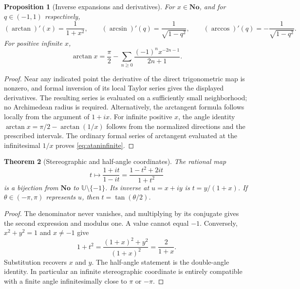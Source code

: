 \documentclass[11pt,letterpaper]{article}
\newtheorem{theorem}{Theorem}[section]
\newtheorem{proposition}[theorem]{Proposition}
\theoremstyle{definition}
\theoremstyle{remark}
\newcommand{\No}{\mathbf{No}}
\newcommand{\UU}{\mathbb U}\newcommand{\HH}{\mathcal H}
\numberwithin{equation}{section}
\begin{document}
\begin{proposition}[Inverse expansions and derivatives]\label{prop:inverses}
For $x\in\No$, and for $q\in(-1,1)$ respectively,
\[
 (\arctan)'(x)=\frac1{1+x^2},\qquad
 (\arcsin)'(q)=\frac1{\sqrt{1-q^2}},\qquad
 (\arccos)'(q)=-\frac1{\sqrt{1-q^2}}.
\]
For positive infinite $x$,
\begin{equation}\label{eq:ataninfinite}
 \arctan x=\frac\pi2-\sum_{n\ge0}\frac{(-1)^n x^{-2n-1}}{2n+1}.
\end{equation}
\end{proposition}
\begin{proof}
Near any indicated point the derivative of the direct trigonometric map is nonzero, and formal inversion of its local Taylor series gives the displayed derivatives. The resulting series is evaluated on a sufficiently small neighborhood; no Archimedean radius is required. Alternatively, the arctangent formula follows locally from the argument of $1+ix$. For infinite positive $x$, the angle identity $\arctan x=\pi/2-\arctan(1/x)$ follows from the normalized directions and the prescribed intervals. The ordinary formal series of arctangent evaluated at the infinitesimal $1/x$ proves \eqref{eq:ataninfinite}.
\end{proof}

\begin{theorem}[Stereographic and half-angle coordinates]\label{thm:stereo}
The rational map
\begin{equation}\label{eq:cayley}
 t\longmapsto \frac{1+it}{1-it}
 =\frac{1-t^2+2it}{1+t^2}
\end{equation}
is a bijection from $\No$ to $\UU\setminus\{-1\}$. Its inverse at $u=x+iy$ is $t=y/(1+x)$. If $\theta\in(-\pi,\pi)$ represents $u$, then $t=\tan(\theta/2)$.
\end{theorem}
\begin{proof}
The denominator never vanishes, and multiplying by its conjugate gives the second expression and modulus one. A value cannot equal $-1$. Conversely, $x^2+y^2=1$ and $x\ne-1$ give
\[
 1+t^2=\frac{(1+x)^2+y^2}{(1+x)^2}=\frac2{1+x}.
\]
Substitution recovers $x$ and $y$. The half-angle statement is the double-angle identity. In particular an infinite stereographic coordinate is entirely compatible with a finite angle infinitesimally close to $\pi$ or $-\pi$.
\end{proof}
\end{document}
